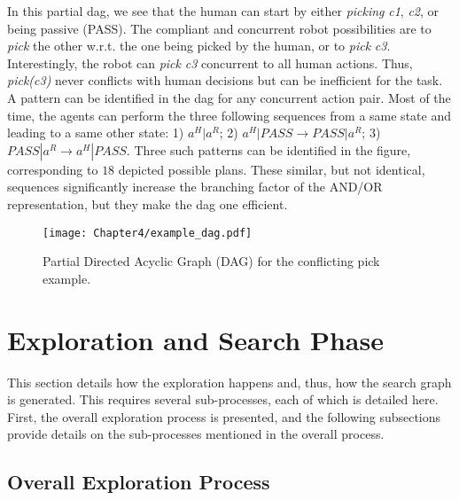 In this partial \acrshort{dag}, we see that the human can start by either \textit{picking} \textit{c1}, \textit{c2}, or being passive (PASS). The compliant and concurrent robot possibilities are to \textit{pick} the other w.r.t. the one being picked by the human, or to \textit{pick} \textit{c3}. Interestingly, the robot can \textit{pick} \textit{c3} concurrent to all human actions. Thus, \textit{pick(c3)} never conflicts with human decisions but can be inefficient for the task. A pattern can be identified in the \acrshort{dag} for any concurrent action pair. Most of the time, the agents can perform the three following sequences from a same state and leading to a same other state: 1) $a^H|a^R$; 2) $a^H|PASS \rightarrow PASS|a^R$; 3) $PASS|a^R \rightarrow a^H|PASS$. Three such patterns can be identified in the figure, corresponding to $18$ depicted possible plans. These similar, but not identical, sequences significantly increase the branching factor of the AND/OR representation, but they make the \acrshort{dag} one efficient. 

\begin{sidewaysfigure}
    \texttt{[image: Chapter4/example\_dag.pdf]}
    \caption{Partial Directed Acyclic Graph (DAG) for the conflicting pick example.}
    \label{fig:example_partial_dag}
\end{sidewaysfigure}

\clearpage

\section{Exploration and Search Phase}

This section details how the exploration happens and, thus, how the search graph is generated. This requires several sub-processes, each of which is detailed here. First, the overall exploration process is presented, and the following subsections provide details on the sub-processes mentioned in the overall process.

    \subsection{Overall Exploration Process}

